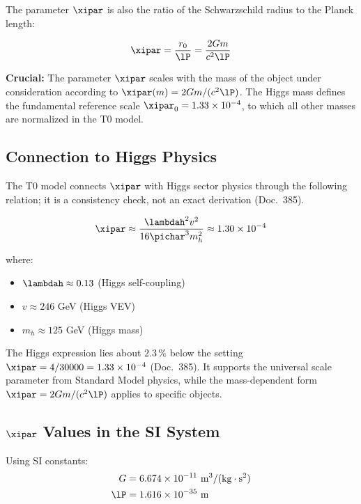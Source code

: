 	The parameter $\xipar$ is also the ratio of the Schwarzschild radius to the Planck length:
	
	\begin{equation}
		\xipar = \frac{r_0}{\lP} = \frac{2Gm}{c^2\lP}
		\label{eq:xi_definition}
	\end{equation}
	
\textbf{Crucial:} The parameter $\xipar$ scales with the mass of the object under consideration according to $\xipar(m) = 2Gm/(c^2\lP)$. The Higgs mass defines the fundamental reference scale $\xipar_0 = 1.33 \times 10^{-4}$, to which all other masses are normalized in the T0 model.
	
	\subsection{Connection to Higgs Physics}
	\label{subsec:xi_higgs_connection}
	
	The T0 model connects $\xipar$ with Higgs sector physics through the following relation; it is a consistency check, not an exact derivation (Doc.~385).
	
	\begin{equation}
		\xipar \approx \frac{\lambdah^2 v^2}{16\pichar^3 m_h^2} \approx 1.30 \times 10^{-4}
		\label{eq:xi_higgs_fundamental}
	\end{equation}
	
	where:
	\begin{itemize}
		\item $\lambdah \approx 0.13$ (Higgs self-coupling)
		\item $v \approx 246$ GeV (Higgs VEV)
		\item $m_h \approx 125$ GeV (Higgs mass)
	\end{itemize}
	
	The Higgs expression lies about $2.3\,\%$ below the setting $\xipar = 4/30000 = 1.33 \times 10^{-4}$ (Doc.~385). It supports the universal scale parameter from Standard Model physics, while the mass-dependent form $\xipar = 2Gm/(c^2\lP)$ applies to specific objects.
	
	\subsection{$\xipar$ Values in the SI System}
	\label{subsec:xi_si_values}
	
	Using SI constants:
	\begin{align}
		G &= 6.674 \times 10^{-11} \text{ m}^3/(\text{kg} \cdot \text{s}^2) \\
		\lP &= 1.616 \times 10^{-35} \text{ m}
	\end{align}
	
